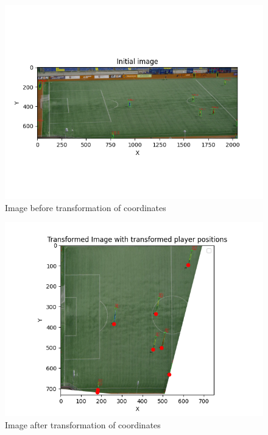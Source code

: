  \begin{figure}[!ht]
     \centering
     \includegraphics[width=0.8\linewidth]{figures/Initial image.png}
     \caption{Image before transformation of coordinates}
     \label{fig:before-transform}
 \end{figure}

  \begin{figure}[!ht]
     \centering
     \includegraphics[width=0.8\linewidth]{figures/Transformed Image with transformed player positions.png}
     \caption{Image after transformation of coordinates}
     \label{fig:after-transform}
 \end{figure}




